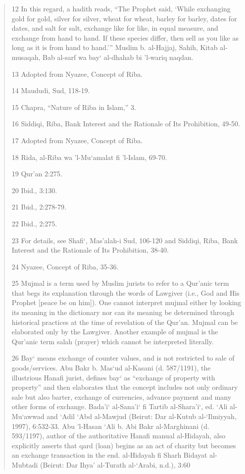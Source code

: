 \begin{quote}
12 In this regard, a hadith reads, “The Prophet said, ‘While exchanging gold for gold, silver for silver, wheat for wheat, barley for barley, dates for dates, and salt for salt, exchange like for like, in equal measure, and exchange from hand to hand. If these species differ, then sell as you like as long as it is from hand to hand.'” Muslim b. al-Hajjaj, Sahih, Kitab al-musaqah, Bab al-sarf wa bay‘ al-dhahab bi 'l-wariq naqdan.

13 Adopted from Nyazee, Concept of Riba.

14 Maududi, Sud, 118-19.

15 Chapra, “Nature of Riba in Islam,” 3.

16 Siddiqi, Riba, Bank Interest and the Rationale of Its Prohibition, 49-50.

17 Adopted from Nyazee, Concept of Riba.

18 Rida, al-Riba wa 'l-Mu‘amalat fi 'l-Islam, 69-70.

19 Qur'an 2:275.

20 Ibid., 3:130.

21 Ibid., 2:278-79.

22 Ibid., 2:275.

23 For details, see Shafi‘, Mas'alah-i Sud, 106-120 and Siddiqi, Riba, Bank Interest and the Rationale of Its Prohibition, 38-40.

24 Nyazee, Concept of Riba, 35-36.

25 Mujmal is a term used by Muslim jurists to refer to a Qur'anic term that begs its explanation through the words of Lawgiver (i.e., God and His Prophet [peace be on him]). One cannot interpret mujmal either by looking its meaning in the dictionary nor can its meaning be determined through historical practices at the time of revelation of the Qur'an. Mujmal can be elaborated only by the Lawgiver. Another example of mujmal is the Qur'anic term salah (prayer) which cannot be interpreted literally.

26 Bay‘ means exchange of counter values, and is not restricted to sale of goods/services. Abu Bakr b. Mas‘ud al-Kasani (d. 587/1191), the illustrious Hanafi jurist, defines bay‘ as “exchange of property with property” and then elaborates that the concept includes not only ordinary sale but also barter, exchange of currencies, advance payment and many other forms of exchange. Bada'i‘ al-Sana'i‘ fi Tartib al-Shara'i‘, ed. ‘Ali al-Mu‘awwad and ‘Adil ‘Abd al-Mawjud (Beirut: Dar al-Kutub al-‘Ilmiyyah, 1997), 6:532-33. Abu 'l-Hasan ‘Ali b. Abi Bakr al-Marghinani (d. 593/1197), author of the authoritative Hanafi manual al-Hidayah, also explicitly asserts that qard (loan) begins as an act of charity but becomes an exchange transaction in the end. al-Hidayah fi Sharh Bidayat al-Mubtadi (Beirut: Dar Ihya' al-Turath al-‘Arabi, n.d.), 3:60


\end{quote}
